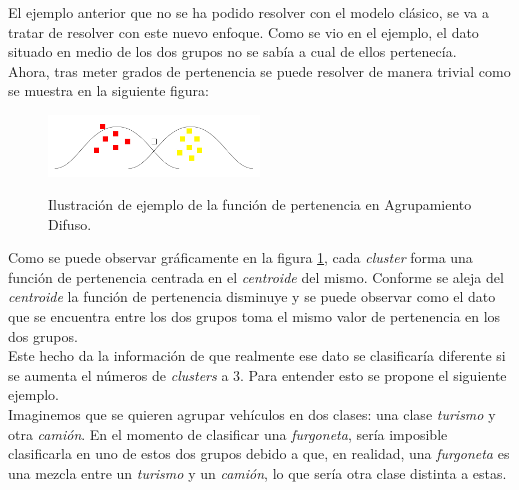 \documentclass[]{report}
\begin{document}
						
			El ejemplo anterior que no se ha podido resolver con el modelo clásico, se va a tratar de resolver con este nuevo enfoque. Como se vio en el ejemplo, el dato situado en medio de los dos grupos no se sabía a cual de ellos pertenecía.\\
			
			Ahora, tras meter grados de pertenencia se puede resolver de manera trivial como se muestra en la siguiente figura:
			
			\begin{figure}[h]
				\centering
				\includegraphics[width=0.5\textwidth]{clustering_difuso.jpg}
				\label{clustering_difuso}
				\caption{Ilustración de ejemplo de la función de pertenencia en Agrupamiento Difuso.}
			\end{figure}
		
			Como se puede observar gráficamente en la figura \ref{clustering_difuso}, cada \textit{cluster} forma una función de pertenencia centrada en el \textit{centroide} del mismo. Conforme se aleja del \textit{centroide} la función de pertenencia disminuye y se puede observar como el dato que se encuentra entre los dos grupos toma el mismo valor de pertenencia en los dos grupos.\\
			
			Este hecho da la información de que realmente ese dato se clasificaría diferente si se aumenta el números de \textit{clusters} a 3. Para entender esto se propone el siguiente ejemplo.\\
			
			Imaginemos que se quieren agrupar vehículos en dos clases: una clase \textit{turismo} y otra \textit{camión}. En el momento de clasificar una \textit{furgoneta}, sería imposible clasificarla en uno de estos dos grupos debido a que, en realidad, una \textit{furgoneta} es una mezcla entre un \textit{turismo} y un \textit{camión}, lo que sería otra clase distinta a estas.\\
			
\end{document}
